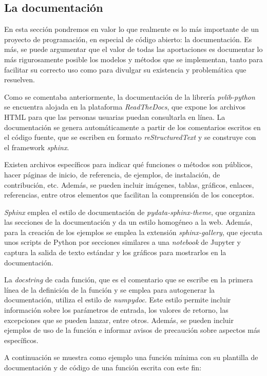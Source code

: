 \subsection{La documentación}

En esta sección pondremos en valor lo que realmente es lo más importante de un proyecto de programación, en especial de código abierto: la documentación. Es más, se puede argumentar que el valor de todas las aportaciones es documentar lo más rigurosamente posible los modelos y métodos que se implementan, tanto para facilitar su correcto uso como para divulgar su existencia y problemática que resuelven.

Como se comentaba anteriormente, la documentación de la librería \textit{pvlib-python} se encuentra alojada en la plataforma \textit{ReadTheDocs}, que expone los archivos HTML para que las personas usuarias puedan consultarla en línea. La documentación se genera automáticamente a partir de los comentarios escritos en el código fuente, que se escriben en formato \textit{reStructuredText} y se construye con el framework \textit{sphinx}.

Existen archivos específicos para indicar qué funciones o métodos son públicos, hacer páginas de inicio, de referencia, de ejemplos, de instalación, de contribución, etc. Además, se pueden incluir imágenes, tablas, gráficos, enlaces, referencias, entre otros elementos que facilitan la comprensión de los conceptos.

\textit{Sphinx} emplea el estilo de documentación de \textit{pydata-sphinx-theme}, que organiza las secciones de la documentación y da un estilo homogéneo a la web. Además, para la creación de los ejemplos se emplea la extensión \textit{sphinx-gallery}, que ejecuta unos scripts de Python por secciones similares a una \textit{notebook} de Jupyter y captura la salida de texto estándar y los gráficos para mostrarlos en la documentación.

La \textit{docstring} de cada función, que es el comentario que se escribe en la primera línea de la definición de la función y se emplea para autogenerar la documentación, utiliza el estilo de \textit{numpydoc}. Este estilo permite incluir información sobre los parámetros de entrada, los valores de retorno, las excepciones que se pueden lanzar, entre otros. Además, se pueden incluir ejemplos de uso de la función e informar avisos de precaución sobre aspectos más específicos.

A continuación se muestra como ejemplo una función mínima con su plantilla de documentación y de código de una función escrita con este fin:

